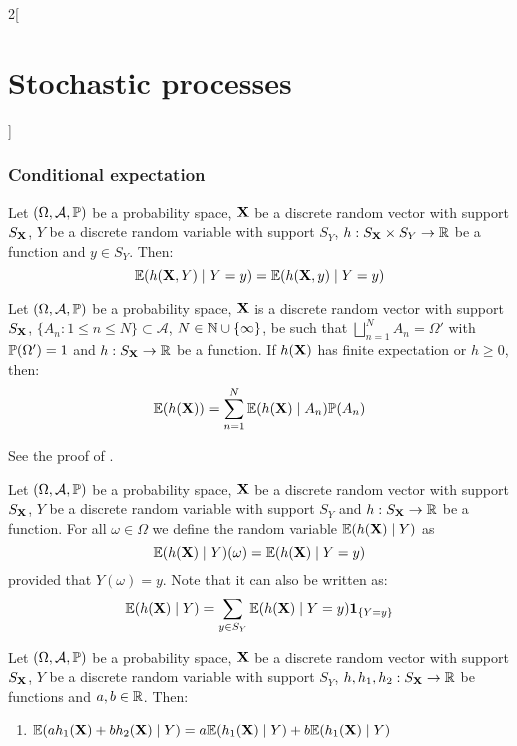 \documentclass[../../../main_math.tex]{subfiles}
\begin{document}
\begin{multicols}{2}[\section{Stochastic processes}]
  \subsubsection{Conditional expectation}
  \begin{proposition}\label{SP:substitutionPrinciple}
    Let $(\Omega,\mathcal{A},\mathbb{P})$ be a probability space, $\boldsymbol{\mathrm{X}}$ be a discrete random vector with support $S_{\boldsymbol{\mathrm{X}}}$, $Y$ be a discrete random variable with support $S_Y$, $h:S_{\boldsymbol{\mathrm{X}}}\times S_Y\rightarrow\mathbb{R}$ be a function and $y\in S_Y$. Then:
    $$\mathbb{E}(h(\boldsymbol{\mathrm{X}},Y)\mid Y=y)=\mathbb{E}(h(\boldsymbol{\mathrm{X}},y)\mid Y=y)$$
  \end{proposition}
  \begin{proposition}\label{SP:totalexp}
    Let $(\Omega,\mathcal{A},\mathbb{P})$ be a probability space, $\boldsymbol{\mathrm{X}}$ is a discrete random vector with support $S_{\boldsymbol{\mathrm{X}}}$, $\{A_n:1\leq n\leq N\}\subset\mathcal{A}$, $N\in\mathbb{N}\cup\{\infty\}$, be such that $\bigsqcup_{n=1}^N A_n=\Omega'$ with $\mathbb{P}(\Omega')=1$ and $h:S_{\boldsymbol{\mathrm{X}}}\rightarrow\mathbb{R}$ be a function. If $h(\boldsymbol{\mathrm{X}})$ has finite expectation or $h\geq 0$, then: $$\mathbb{E}(h(\boldsymbol{\mathrm{X}}))=\sum_{n=1}^N\mathbb{E}(h(\boldsymbol{\mathrm{X}})\mid A_n)\mathbb{P}(A_n)$$
  \end{proposition}
  \begin{sproof}
    See the proof of .
  \end{sproof}
  \begin{definition}
    Let $(\Omega,\mathcal{A},\mathbb{P})$ be a probability space, $\boldsymbol{\mathrm{X}}$ be a discrete random vector with support $S_{\boldsymbol{\mathrm{X}}}$, $Y$ be a discrete random variable with support $S_Y$ and $h:S_{\boldsymbol{\mathrm{X}}}\rightarrow\mathbb{R}$ be a function. For all $\omega\in\Omega$ we define the random variable $\mathbb{E}(h(\boldsymbol{\mathrm{X}})\mid Y)$ as
    $$\mathbb{E}(h(\boldsymbol{\mathrm{X}})\mid Y)(\omega)=\mathbb{E}(h(\boldsymbol{\mathrm{X}})\mid Y=y)$$
    provided that $Y(\omega)=y$.
    Note that it can also be written as:
    $$\mathbb{E}(h(\boldsymbol{\mathrm{X}})\mid Y)=\sum_{y\in S_Y}\mathbb{E}(h(\boldsymbol{\mathrm{X}})\mid Y=y)\boldsymbol{\mathrm{1}}_{\{Y=y\}}$$
  \end{definition}
  \begin{proposition}
    Let $(\Omega,\mathcal{A},\mathbb{P})$ be a probability space, $\boldsymbol{\mathrm{X}}$ be a discrete random vector with support $S_{\boldsymbol{\mathrm{X}}}$, $Y$ be a discrete random variable with support $S_Y$, $h,h_1,h_2:S_{\boldsymbol{\mathrm{X}}}\rightarrow\mathbb{R}$ be functions and $a,b\in\mathbb{R}$. Then:
    \begin{enumerate}
      \item $\mathbb{E}(ah_1(\boldsymbol{\mathrm{X}})+bh_2(\boldsymbol{\mathrm{X}})\mid Y)=a\mathbb{E}(h_1(\boldsymbol{\mathrm{X}})\mid Y)+b\mathbb{E}(h_1(\boldsymbol{\mathrm{X}})\mid Y)$

\end{enumerate}
\end{proposition}
\end{multicols}
\end{document}

